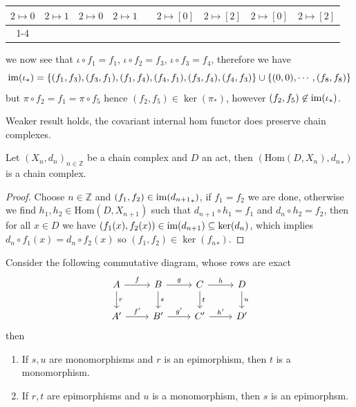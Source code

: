\begin{counterexample}
\begin{table}[H]
\begin{tabular}{ccccccccc}
        \multicolumn{1}{|c|}{$2\mapsto 0$} & \multicolumn{1}{c|}{$2\mapsto 1$} & \multicolumn{1}{c|}{$2\mapsto 0$} & \multicolumn{1}{c|}{$2\mapsto 1$} & \multicolumn{1}{c|}{}             & \multicolumn{1}{c|}{$2\mapsto [0]$} & \multicolumn{1}{c|}{$2\mapsto [2]$} & \multicolumn{1}{c|}{$2\mapsto [0]$} & \multicolumn{1}{c|}{$2\mapsto [2]$} \\ \cline{1-4} \cline{6-9} 
        \end{tabular}
        \end{table}
    we now see that 
    $\iota\circ f_1 = f_1$, $\iota\circ f_2 = f_3$, $\iota\circ f_3 = f_4$, therefore we have
    \[
        \text{im}(\iota_*) = \{(f_1,f_3),(f_3,f_1),(f_1,f_4),(f_4,f_1),(f_3,f_4),(f_4,f_3)\}\cup\{(0,0),\cdots,(f_8,f_8)\}
    \]
    but $\pi\circ f_2 = f_1 = \pi\circ f_5$ hence $(f_2,f_5)\in\ker(\pi_*)$, however $(f_2,f_5)\not\in\text{im}(\iota_*)$.
\end{counterexample}
    Weaker result holds, the covariant internal hom functor does preserve chain complexes.
\begin{proposition}
    Let $(X_n, d_n)_{n\in\mathbb{Z}}$ be a chain complex and $D$ an act, then 
    $(\text{Hom}(D,X_n),{d_n}_*)$ is a chain complex.
\end{proposition}
\begin{proof}[Proof]
    Choose $n\in\mathbb{Z}$ and $(f_1,f_2)\in\text{im}({d_{n+1}}_*)$, if 
    $f_1=f_2$ we are done, otherwise we find $h_1,h_2\in\text{Hom}(D,X_{n+1})$
    such that $d_{n+1}\circ h_1 = f_1$ and $d_n\circ h_2 = f_2$, then 
    for all $x\in D$ we have $(f_1(x),f_2(x))\in\text{im}(d_{n+1})\subseteq\ker(d_n)$,
    which implies $d_n\circ f_1(x)=d_n\circ f_2(x)$ so $(f_1,f_2)\in\ker({f_n}_*)$.
\end{proof}
\begin{lemma}
    Consider the following commutative diagram, whose rows are exact
    \[\begin{tikzcd}
        A & B & C & D \\
        {A'} & {B'} & {C'} & {D'}
        \arrow["f", from=1-1, to=1-2]
        \arrow["r", from=1-1, to=2-1]
        \arrow["g", from=1-2, to=1-3]
        \arrow["s", from=1-2, to=2-2]
        \arrow["h", from=1-3, to=1-4]
        \arrow["t", from=1-3, to=2-3]
        \arrow["u", from=1-4, to=2-4]
        \arrow["{f'}", from=2-1, to=2-2]
        \arrow["{g'}", from=2-2, to=2-3]
        \arrow["{h'}", from=2-3, to=2-4]
    \end{tikzcd}\]
    then 
    \begin{enumerate}
        \item If $s,u$ are monomorphisms and $r$ is an epimorphism, then $t$ is a monomorphism.
        \item If $r,t$ are epimorphisms and $u$ is a monomorphism, then $s$ is an epimorphsm.
    \end{enumerate}
\end{lemma}
